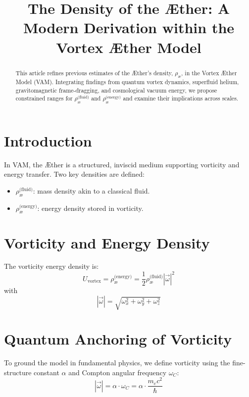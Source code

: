 \documentclass[12pt]{article}
\title{The Density of the \AE{}ther: A Modern Derivation within the Vortex \AE{}ther Model}
\author{}
\date{}
\begin{document}
    \maketitle

    \begin{abstract}
        This article refines previous estimates of the \AE{}ther's density, $\rho_{\text{\ae}}$, in the Vortex \AE{}ther Model (VAM). Integrating findings from quantum vortex dynamics, superfluid helium, gravitomagnetic frame-dragging, and cosmological vacuum energy, we propose constrained ranges for $\rho_{\text{\ae}}^{\text{(fluid)}}$ and $\rho_{\text{\ae}}^{\text{(energy)}}$ and examine their implications across scales.
    \end{abstract}

    \section{Introduction}

    In VAM, the \AE{}ther is a structured, inviscid medium supporting vorticity and energy transfer. Two key densities are defined:
    \begin{itemize}
        \item $\rho_{\text{\ae}}^{\text{(fluid)}}$: mass density akin to a classical fluid.
        \item $\rho_{\text{\ae}}^{\text{(energy)}}$: energy density stored in vorticity.
    \end{itemize}

    \section{Vorticity and Energy Density}

    The vorticity energy density is:
    \[
        U_{\text{vortex}} = \rho_{\text{\ae}}^{\text{(energy)}} = \frac{1}{2} \rho_{\text{\ae}}^{\text{(fluid)}} |\vec{\omega}|^2
    \]
    with
    \[
        |\vec{\omega}| = \sqrt{\omega_x^2 + \omega_y^2 + \omega_z^2}
    \]

    \section{Quantum Anchoring of Vorticity}

    To ground the model in fundamental physics, we define vorticity using the fine-structure constant $\alpha$ and Compton angular frequency $\omega_C$:
    \[
        |\vec{\omega}| = \alpha \cdot \omega_C = \alpha \cdot \frac{m_e c^2}{\hbar}
    \]
\end{document}
